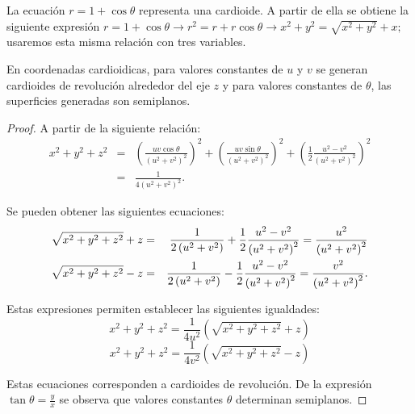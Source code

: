 La ecuación $r=1+\cos\theta$ representa una cardioide.
A partir de ella se obtiene la siguiente expresión
$r=1+\cos\theta \to r^2=r+r\cos\theta \to x^2+y^2=\sqrt{x^2+y^2}+x;$ %
usaremos esta misma relación con tres variables.

\begin{prop}
En coordenadas cardioidicas, para valores constantes de $u$ y $v$
se generan cardioides de revolución alrededor del eje $z$ y para valores constantes de
$\theta$, las superficies generadas son semiplanos.
\end{prop}
%
\begin{proof}
A partir de la siguiente relación:
\begin{eqnarray*}
x^2+y^2+z^2 &=& \left( \frac{uv\cos \theta}{\left( u^2+v^2\right) ^2} \right) ^2+\left( \frac{uv\sin \theta}{\left( u^2+v^2\right) ^2} \right) ^2+\left( \frac{1}{2}\frac{u^2-v^2}{\left(
u^2+v^2\right) ^2}\right) ^2 \\ &=& \frac{1}{4\left(u^2+v^2\right) ^2}.
\end{eqnarray*}

Se pueden obtener las siguientes ecuaciones:
\begin{eqnarray*}
\sqrt{x^2+y^2+z^2}+z &=& \frac{1}{2\left( u^2+v^2\right) }+\frac{1}{2}%
\frac{u^2-v^2}{\left( u^2+v^2\right) ^2}= \frac{u^2}{%
\left( u^2+v^2\right) ^2} \\
\sqrt{x^2+y^2+z^2}-z &=& \frac{1}{2\left( u^2+v^2\right) }-\frac{1}{2}%
\frac{u^2-v^2}{\left( u^2+v^2\right) ^2}= \frac{v^2}{%
\left( u^2+v^2\right) ^2}.
\end{eqnarray*}

Estas expresiones permiten establecer las siguientes igualdades:
\[x^2+y^2+z^2=\frac{1}{4u^2}\left( \sqrt{x^2+y^2+z^2}+z\right)\]
\[x^2+y^2+z^2=\frac{1}{4v^2}\left( \sqrt{x^2+y^2+z^2}-z\right)\]

Estas ecuaciones corresponden a cardioides de revolución.
De la expresión $\tan \theta =\frac{y}{x}$ se observa que valores constantes $\theta$
determinan semiplanos.
\end{proof}

